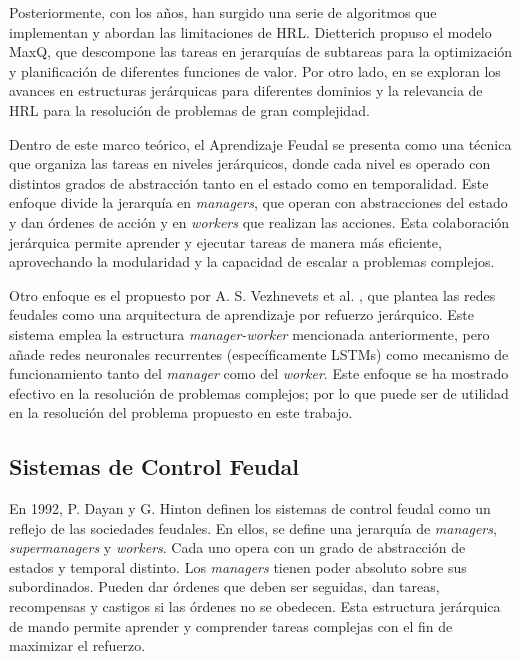 \documentclass[letterpaper]{article} %
\begin{document}
Posteriormente, con los años, han surgido una serie de algoritmos que implementan y abordan las limitaciones de HRL. 
Dietterich \cite{dietterich2000hierarchical} propuso el modelo MaxQ, que descompone las tareas en jerarquías de subtareas
para la optimización y planificación de diferentes funciones de valor. Por otro lado, en \cite{barto2003recent} se exploran 
los avances en estructuras jerárquicas para diferentes dominios y la relevancia de HRL para la resolución de problemas de 
gran complejidad.  

Dentro de este marco teórico, el Aprendizaje Feudal se presenta como una técnica que organiza las tareas en niveles jerárquicos, donde cada nivel 
es operado con distintos grados de abstracción tanto en el estado como en temporalidad. Este enfoque \cite{dayan1992feudal} divide la jerarquía en \textit{managers}, que operan con abstracciones 
del estado y dan órdenes de acción y en \textit{workers} que realizan las acciones. Esta colaboración jerárquica permite aprender y ejecutar tareas de manera más eficiente, aprovechando
la modularidad y la capacidad de escalar a problemas complejos.

Otro enfoque es el propuesto por A. S. Vezhnevets et al. \cite{vezhnevets2017feudal}, que plantea las redes feudales como una arquitectura de aprendizaje por refuerzo jerárquico.
Este sistema emplea la estructura \textit{manager-worker} mencionada anteriormente, pero añade redes neuronales recurrentes (específicamente LSTMs) como mecanismo de funcionamiento tanto del 
\textit{manager} como del \textit{worker}. Este enfoque se ha mostrado efectivo en la resolución de problemas complejos; por lo que puede ser de utilidad en la resolución del problema propuesto en este trabajo.

\subsection{Sistemas de Control Feudal}
En 1992, P. Dayan y G. Hinton \cite{dayan1992feudal} definen los sistemas de control feudal como un reflejo de las sociedades feudales. En ellos, se 
define una jerarquía de \textit{managers}, \textit{supermanagers} y \textit{workers}. Cada uno opera con un grado de abstracción de estados y temporal
distinto. Los \textit{managers} tienen poder absoluto sobre sus subordinados. Pueden dar órdenes que deben ser seguidas, dan tareas, recompensas y castigos si 
las órdenes no se obedecen. Esta estructura jerárquica de mando permite aprender y comprender tareas complejas con el fin de maximizar el refuerzo.
\end{document}
